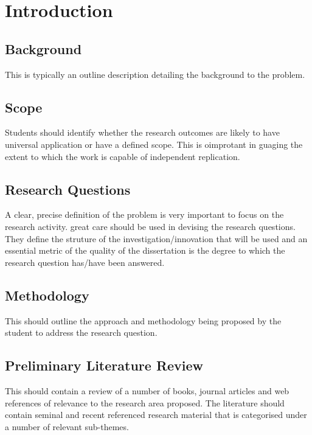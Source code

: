 \documentclass[runningheads,a4paper]{llncs}
\begin{document}
%
%
\section{Introduction}

\subsection{Background}
This is typically an outline description detailing the background	 to the problem.
  
%
\newpage
%
\subsection{Scope}
Students should identify whether the research outcomes are likely to have universal application or have a defined scope. This is oimprotant in guaging the extent to which the work is capable of independent replication.

%
\newpage
%
\subsection{Research Questions}
A clear, precise definition of the problem is very important to focus on the research activity. great care should be used in devising the research questions. They define the struture of the investigation/innovation that will be used and an essential metric of the quality of the dissertation is the degree to which the research question has/have been answered.

%
\newpage
%
\subsection{Methodology}
This should outline the approach and methodology being proposed by the student to address the research question.

%
\newpage
%
\subsection{Preliminary Literature Review}
This should contain a review of a number of books, journal articles and web references of relevance to the research area proposed. The literature should contain seminal and recent referenced research material that is categorised under a number of relevant sub-themes.
\end{document}
